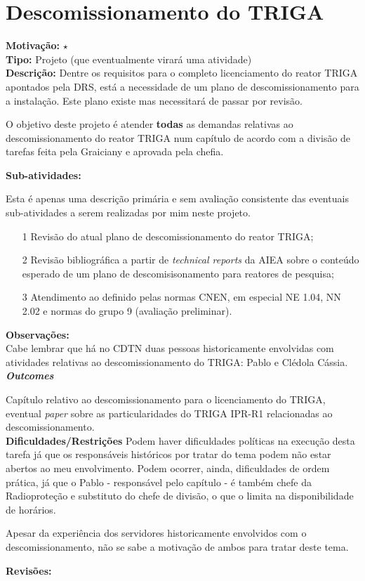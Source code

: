 \chapter{Descomissionamento do TRIGA}

\textbf{Motivação:} $\star$\\

\textbf{Tipo:} Projeto (que eventualmente virará  uma atividade)\\

\textbf{Descrição:} Dentre os requisitos para o completo licenciamento do reator TRIGA apontados pela DRS, está a necessidade de um plano de descomissionamento para a instalação. Este plano existe mas necessitará de passar por revisão. 

O objetivo deste projeto é atender \textbf{todas} as demandas relativas ao descomissionamento do reator TRIGA num capítulo de acordo com a divisão de tarefas 
feita pela Graiciany e aprovada pela chefia.

\textbf{Sub-atividades:}

Esta é apenas uma descrição primária e sem avaliação consistente das eventuais 
sub-atividades a serem realizadas por mim neste projeto.

\begin{itemize}
	\item[1] Revisão do atual plano de descomissionamento do reator TRIGA;
	\item[2] Revisão bibliográfica a partir de \textit{technical reports} da AIEA 
	sobre o conteúdo esperado de um plano de descomisisonamento para reatores de pesquisa;
	\item[3] Atendimento ao definido pelas normas CNEN, em especial NE 1.04, NN 2.02 e normas do grupo 9 (avaliação preliminar).
\end{itemize}

\textbf{Observações:}\\

Cabe lembrar que há no CDTN duas pessoas historicamente envolvidas com atividades relativas ao descomissionamento do TRIGA: Pablo e Clédola Cássia.\\

\textbf{\textit{Outcomes}}

Capítulo relativo ao descomissionamento para o licenciamento do TRIGA, eventual 
\textit{paper} sobre as particularidades do TRIGA IPR-R1 relacionadas ao descomissionamento.\\

\textbf{Dificuldades/Restrições}
Podem haver dificuldades políticas na execução desta tarefa já que os responsáveis 
históricos por tratar do tema podem não estar abertos ao meu envolvimento. Podem ocorrer, ainda, dificuldades de ordem prática, já que o Pablo - responsável pelo capítulo - é também chefe da Radioproteção e substituto do chefe de divisão, o que 
o limita na disponibilidade de horários.

Apesar da experiência dos servidores historicamente envolvidos com o descomissionamento, não se sabe a motivação de ambos para tratar deste tema.


\textbf{Revisões:}
\date{17 de dezembro de 2018}
